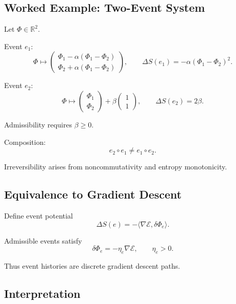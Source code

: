 \documentclass[11pt]{article}
\begin{document}
\subsection*{Worked Example: Two-Event System}

Let $\Phi \in \mathbb{R}^2$.

Event $e_1$:
\begin{equation}
\Phi \mapsto
\begin{pmatrix}
\Phi_1 - \alpha(\Phi_1-\Phi_2) \\
\Phi_2 + \alpha(\Phi_1-\Phi_2)
\end{pmatrix},
\qquad
\Delta S(e_1) = -\alpha(\Phi_1-\Phi_2)^2.
\end{equation}

Event $e_2$:
\begin{equation}
\Phi \mapsto
\begin{pmatrix}
\Phi_1 \\
\Phi_2
\end{pmatrix}
+
\beta
\begin{pmatrix}
1 \\
1
\end{pmatrix},
\qquad
\Delta S(e_2) = 2\beta.
\end{equation}

Admissibility requires $\beta \ge 0$.

Composition:
\begin{equation}
e_2 \circ e_1 \neq e_1 \circ e_2.
\end{equation}

Irreversibility arises from noncommutativity and entropy monotonicity.

\subsection*{Equivalence to Gradient Descent}

Define event potential
\begin{equation}
\Delta S(e) = -\langle \nabla \mathcal{E}, \delta\Phi_e \rangle.
\end{equation}

Admissible events satisfy
\begin{equation}
\delta\Phi_e = -\eta_e \nabla \mathcal{E},
\qquad
\eta_e > 0.
\end{equation}

Thus event histories are discrete gradient descent paths.

\subsection*{Interpretation}
\end{document}
